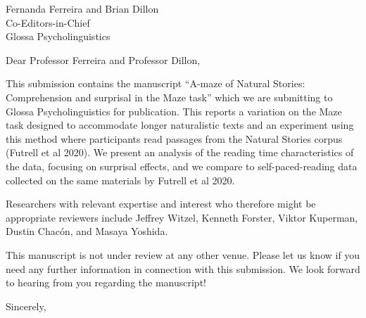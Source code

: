 \documentclass{stanfordletter}
\begin{document}
	\signature{Veronica Boyce \\ Roger Levy}
	
	
	\begin{letter}{Fernanda Ferreira and Brian Dillon \\ Co-Editors-in-Chief \\ Glossa Psycholinguistics}
		
		
		\opening{Dear Professor Ferreira and Professor Dillon,} 
		 This submission contains the manuscript ``A-maze of Natural Stories: Comprehension and surprisal in the Maze task'' which we are submitting to Glossa Psycholinguistics for publication. This reports a variation on the Maze task designed to accommodate longer naturalistic texts and an experiment using this method where participants read passages from the Natural Stories corpus (Futrell et al 2020). We present an analysis of the reading time characteristics of the data, focusing on surprisal effects, and we compare to self-paced-reading data collected on the same materials by Futrell et al 2020. 
		 
		 Researchers with relevant expertise and interest who therefore might be appropriate reviewers include Jeffrey Witzel, Kenneth Forster, Viktor Kuperman, Dustin Chac{\'o}n, and Masaya Yoshida.
		 
		 This manuscript is not under review at any other venue. Please let us know if you need any further information in
		 connection with this submission. We look forward to hearing from you regarding the manuscript!
		\closing{Sincerely,}
		
	\end{letter}
	
\end{document}
